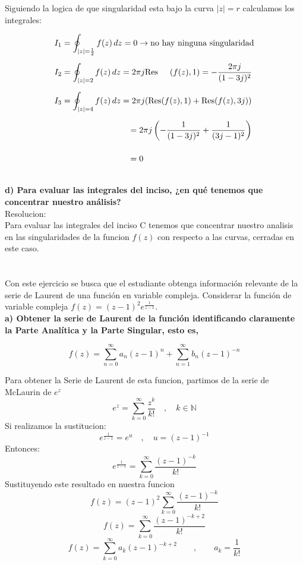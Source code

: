 \documentclass[12pt]{report}
\begin{document}
Siguiendo la logica de que singularidad esta bajo la curva $|z|=r$ calculamos los integrales:

\begin{align*}
I_1&= \oint_{|z|=\frac{1}{2}}f(z) \, dz = 0 \rightarrow \text{no hay ninguna singularidad}\\[6pt]
I_2&= \oint_{|z|=2}f(z) \, dz = 2 \pi j \text{Res}\hspace{0.5cm}(f(z),1)= -\frac{2 \pi j}{(1-3j)^2}\\[6pt]
I_3&= \oint_{|z|=4}f(z) \, dz = 2 \pi j(\text{Res}(f(z),1)+\text{Res}(f(z),3j))\\[6pt]
&\phantom{I_3=\oint_{|z|=4}f(z) \, dz } =2\pi j \left( -\frac{1}{(1-3j)^2} + \frac{1}{(3j-1)^2} \right)\\[6pt]
&\phantom{I_3=\oint_{|z|=4}f(z) \, dz }=0\\[6pt]
\end{align*}

\textbf{d) Para evaluar las integrales del inciso, ¿en qué tenemos que concentrar nuestro análisis?}\\

Resolucion:\\
Para evaluar las integrales del inciso C tenemos que concentrar nuestro analisis en las singularidades de la funcion $f(z)$ con respecto a las curvas, cerradas en este caso.\\

\chapter{}%

Con este ejercicio se busca que el estudiante obtenga información relevante de la serie de Laurent de una función en variable compleja.
Considerar la función de variable compleja $ f(z) = (z - 1)^2 e^\frac{1}{z - 1} $.\\[6pt]

\textbf{a)  Obtener la serie de Laurent de la función identificando claramente la Parte Analítica y la Parte Singular, esto es,}

$$ f(z) = \sum_{n=0}^{\infty} a_n(z - 1)^n + \sum_{n=1}^{\infty} b_n(z - 1)^{-n} $$

Para obtener la Serie de Laurent de esta funcion, partimos de la serie de McLaurin de $e^z$
$$e^z=\sum_{k=0}^{\infty}\frac{z^k}{k!}\quad,\quad k \in \mathbb{N}$$
Si realizamos la sustitucion:
$$e^\frac{1}{z - 1}=e^u \quad, \quad u=(z - 1)^{-1}$$
Entonces:
$$e^\frac{1}{z - 1}=\sum_{k=0}^{\infty}\frac{(z - 1)^{-k}}{k!}$$
Sustituyendo este resultado en nuestra funcion
$$f(z) = (z - 1)^2 \sum_{k=0}^{\infty}\frac{(z - 1)^{-k}}{k!}$$
$$f(z) = \sum_{k=0}^{\infty}\frac{(z - 1)^{-k+2}}{k!}$$
$$f(z) = \sum_{k=0}^{\infty}a_k(z - 1)^{-k+2}\qquad, \qquad a_k=\frac{1}{k!}$$
\end{document}
